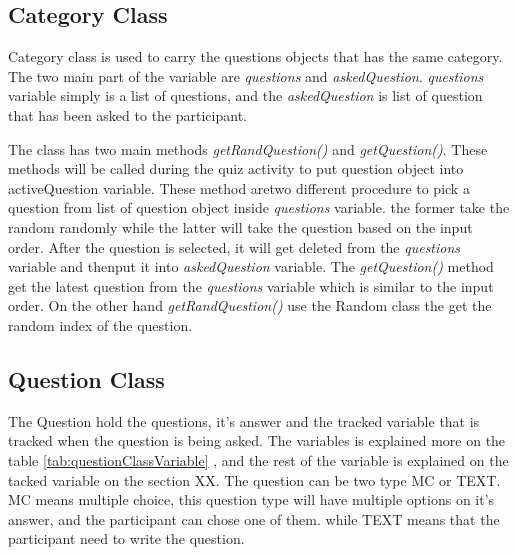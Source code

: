 \subsection{Category Class}
Category class is used to carry the questions objects that has the same category. The two main part of the variable are \textit{questions} and \textit{askedQuestion}. \textit{questions} variable simply is a list of questions, and the \textit{askedQuestion} is list of question that has been asked to the participant.

The class has two main methods \textit{getRandQuestion()} and \textit{getQuestion()}. These methods will be called during the quiz activity to put question object into activeQuestion variable.
These method aretwo different procedure to pick a question from list of question object inside \textit{questions} variable. the former take the random randomly while the latter will take the question based on the input order. After the question is selected, it will get deleted from the \textit{questions} variable and thenput it into \textit{askedQuestion} variable.
The \textit{getQuestion()} method get the latest question from the \textit{questions} variable which is similar to the input order. On the other hand \textit{getRandQuestion()} use the Random class the get the random index of the question.

\subsection{Question Class}
The Question hold the questions, it's answer and the tracked variable that is tracked when the question is being asked. The variables is explained more on the table \ref{tab:questionClassVariable}
, and the rest of the variable is explained on the tacked variable on the section XX.
The question can be two type MC or TEXT. MC means multiple choice, this question type will have multiple options on it's answer, and the participant can chose one of them. while TEXT means that the participant need to write the question.

